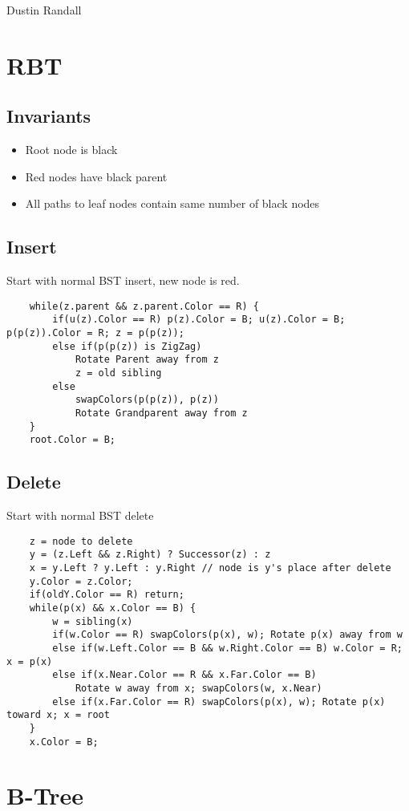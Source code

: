 \documentclass{article}
\begin{document}
Dustin Randall \\

\section{RBT}
\subsection*{Invariants}
\begin{itemize}
    \item Root node is black
    \item Red nodes have black parent
    \item All paths to leaf nodes contain same number of black nodes
\end{itemize}
\subsection*{Insert}
Start with normal BST insert, new node is red.
\begin{lstlisting}
    while(z.parent && z.parent.Color == R) {
        if(u(z).Color == R) p(z).Color = B; u(z).Color = B; p(p(z)).Color = R; z = p(p(z));
        else if(p(p(z)) is ZigZag)
            Rotate Parent away from z
            z = old sibling
        else
            swapColors(p(p(z)), p(z))
            Rotate Grandparent away from z
    }
    root.Color = B;
\end{lstlisting}

\subsection*{Delete}
Start with normal BST delete
\begin{lstlisting}
    z = node to delete
    y = (z.Left && z.Right) ? Successor(z) : z
    x = y.Left ? y.Left : y.Right // node is y's place after delete
    y.Color = z.Color;
    if(oldY.Color == R) return;
    while(p(x) && x.Color == B) {
        w = sibling(x)
        if(w.Color == R) swapColors(p(x), w); Rotate p(x) away from w
        else if(w.Left.Color == B && w.Right.Color == B) w.Color = R; x = p(x)
        else if(x.Near.Color == R && x.Far.Color == B) 
            Rotate w away from x; swapColors(w, x.Near)
        else if(x.Far.Color == R) swapColors(p(x), w); Rotate p(x) toward x; x = root
    }
    x.Color = B;
\end{lstlisting}

\section{B-Tree}
\end{document}

